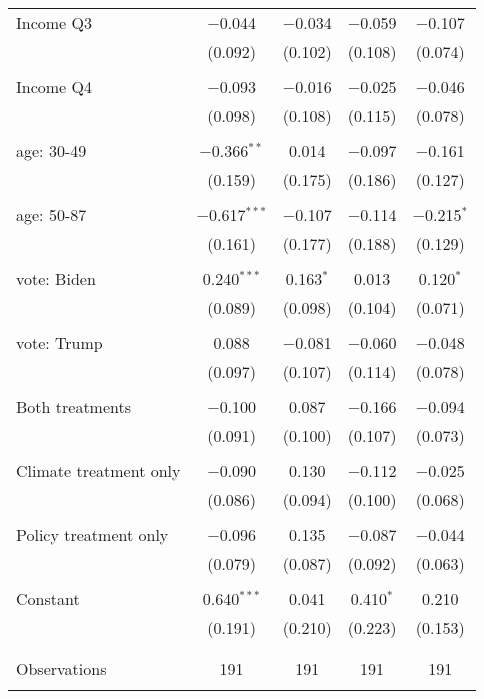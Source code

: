 \begin{tabular}{@{\extracolsep{5pt}}lcccc}
 Income Q3 & $-$0.044 & $-$0.034 & $-$0.059 & $-$0.107 \\ 
  & (0.092) & (0.102) & (0.108) & (0.074) \\ 
  & & & & \\ 
 Income Q4 & $-$0.093 & $-$0.016 & $-$0.025 & $-$0.046 \\ 
  & (0.098) & (0.108) & (0.115) & (0.078) \\ 
  & & & & \\ 
 age: 30-49 & $-$0.366$^{**}$ & 0.014 & $-$0.097 & $-$0.161 \\ 
  & (0.159) & (0.175) & (0.186) & (0.127) \\ 
  & & & & \\ 
 age: 50-87 & $-$0.617$^{***}$ & $-$0.107 & $-$0.114 & $-$0.215$^{*}$ \\ 
  & (0.161) & (0.177) & (0.188) & (0.129) \\ 
  & & & & \\ 
 vote: Biden & 0.240$^{***}$ & 0.163$^{*}$ & 0.013 & 0.120$^{*}$ \\ 
  & (0.089) & (0.098) & (0.104) & (0.071) \\ 
  & & & & \\ 
 vote: Trump & 0.088 & $-$0.081 & $-$0.060 & $-$0.048 \\ 
  & (0.097) & (0.107) & (0.114) & (0.078) \\ 
  & & & & \\ 
 Both treatments & $-$0.100 & 0.087 & $-$0.166 & $-$0.094 \\ 
  & (0.091) & (0.100) & (0.107) & (0.073) \\ 
  & & & & \\ 
 Climate treatment only & $-$0.090 & 0.130 & $-$0.112 & $-$0.025 \\ 
  & (0.086) & (0.094) & (0.100) & (0.068) \\ 
  & & & & \\ 
 Policy treatment only & $-$0.096 & 0.135 & $-$0.087 & $-$0.044 \\ 
  & (0.079) & (0.087) & (0.092) & (0.063) \\ 
  & & & & \\ 
 Constant & 0.640$^{***}$ & 0.041 & 0.410$^{*}$ & 0.210 \\ 
  & (0.191) & (0.210) & (0.223) & (0.153) \\ 
  & & & & \\ 
\hline \\[-1.8ex] 

Observations & 191 & 191 & 191 & 191 \\ 
\hline 
\hline \\[-1.8ex] 
\end{tabular} 